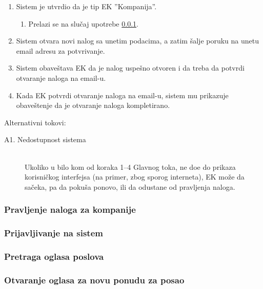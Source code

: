 \begin{enumerate}
	\item Sistem je utvrdio da je tip EK ''Kompanija''.
	\begin{enumerate}
		\item Prelazi se na slu\v caj upotrebe \ref{su: pravljenje naloga za kompanije}.
	\end{enumerate}
	\item Sistem otvara novi nalog sa unetim podacima, a zatim \v salje poruku na unetu email adresu za potvr\dj ivanje.
	\item Sistem obave\v stava EK da je nalog uspe\v sno otvoren i da treba da potvrdi otvaranje naloga na email-u.
	\item Kada EK potvrdi otvaranje naloga na email-u, sistem mu prikazuje obave\v stenje da je otvaranje naloga kompletirano.
\end{enumerate}

\noindent Alternativni tokovi: 
\begin{description}
	\item[A1. Nedostupnost sistema] ~\\
	Ukoliko u bilo kom od koraka 1--4 Glavnog toka, ne do\dj e do prikaza korisni\v ckog interfejsa (na primer, zbog sporog interneta), EK mo\v ze da sa\v ceka, pa da poku\v sa ponovo, ili da odustane od pravljenja naloga.
\end{description}

\subsubsection{Pravljenje naloga za kompanije}
\label{su: pravljenje naloga za kompanije}

\subsubsection{Prijavljivanje na sistem}
\label{su: prijavljivanje na sistem}

\subsubsection{Pretraga oglasa poslova}
\label{su: pretraga oglasa poslova}

\subsubsection{Otvaranje oglasa za novu ponudu za posao}
\label{su: otvaranje oglasa za novu ponudu za posao}

\newpage